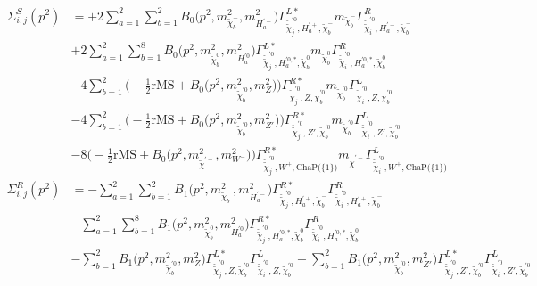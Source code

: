 \begin{itemize}
\begin{align} 
\Sigma^S_{i,j}(p^2) &= +2 \sum_{a=1}^{2}\sum_{b=1}^{2}{B_0\Big(p^{2},m^2_{\tilde{\chi}^-_{{b}}},m^2_{H^{'-}_{{a}}}\Big)} {\Gamma^{L*}_{\check{\tilde{\chi}}^{'0}_{{j}},H^{'+}_{{a}},\tilde{\chi}^-_{{b}}}} m_{\tilde{\chi}^-_{{b}}} {\Gamma^R_{\check{\tilde{\chi}}^{'0}_{{i}},H^{'+}_{{a}},\tilde{\chi}^-_{{b}}}}  \nonumber \\ 
 &+2 \sum_{a=1}^{2}\sum_{b=1}^{8}{B_0\Big(p^{2},m^2_{\tilde{\chi}^0_{{b}}},m^2_{H^{'0}_{{a}}}\Big)} {\Gamma^{L*}_{\check{\tilde{\chi}}^{'0}_{{j}},H^{{'0},*}_{{a}},\tilde{\chi}^0_{{b}}}} m_{\tilde{\chi}^0_{{b}}} {\Gamma^R_{\check{\tilde{\chi}}^{'0}_{{i}},H^{{'0},*}_{{a}},\tilde{\chi}^0_{{b}}}}  \nonumber \\ 
 &-4 \sum_{b=1}^{2}\Big(-\frac{1}{2} \text{rMS}  + {B_0\Big(p^{2},m^2_{\tilde{\chi}^{'0}_{{b}}},m^2_{Z}\Big)}\Big){\Gamma^{R*}_{\check{\tilde{\chi}}^{'0}_{{j}},Z,\tilde{\chi}^{'0}_{{b}}}} m_{\tilde{\chi}^{'0}_{{b}}} {\Gamma^L_{\check{\tilde{\chi}}^{'0}_{{i}},Z,\tilde{\chi}^{'0}_{{b}}}}  \nonumber \\ 
 &-4 \sum_{b=1}^{2}\Big(-\frac{1}{2} \text{rMS}  + {B_0\Big(p^{2},m^2_{\tilde{\chi}^{'0}_{{b}}},m^2_{{Z'}}\Big)}\Big){\Gamma^{R*}_{\check{\tilde{\chi}}^{'0}_{{j}},{Z'},\tilde{\chi}^{'0}_{{b}}}} m_{\tilde{\chi}^{'0}_{{b}}} {\Gamma^L_{\check{\tilde{\chi}}^{'0}_{{i}},{Z'},\tilde{\chi}^{'0}_{{b}}}}  \nonumber \\ 
 &-8 \Big(-\frac{1}{2} \text{rMS}  + {B_0\Big(p^{2},m^2_{\tilde{\chi}^{'-}},m^2_{W^-}\Big)}\Big){\Gamma^{R*}_{\check{\tilde{\chi}}^{'0}_{{j}},W^+,\text{ChaP}\Big(\{1\}\Big)}} m_{\tilde{\chi}^{'-}} {\Gamma^L_{\check{\tilde{\chi}}^{'0}_{{i}},W^+,\text{ChaP}\Big(\{1\}\Big)}} \\ 
\Sigma^R_{i,j}(p^2) &= - \sum_{a=1}^{2}\sum_{b=1}^{2}{B_1\Big(p^{2},m^2_{\tilde{\chi}^-_{{b}}},m^2_{H^{'-}_{{a}}}\Big)} {\Gamma^{R*}_{\check{\tilde{\chi}}^{'0}_{{j}},H^{'+}_{{a}},\tilde{\chi}^-_{{b}}}} {\Gamma^R_{\check{\tilde{\chi}}^{'0}_{{i}},H^{'+}_{{a}},\tilde{\chi}^-_{{b}}}}  \nonumber \\ 
 &- \sum_{a=1}^{2}\sum_{b=1}^{8}{B_1\Big(p^{2},m^2_{\tilde{\chi}^0_{{b}}},m^2_{H^{'0}_{{a}}}\Big)} {\Gamma^{R*}_{\check{\tilde{\chi}}^{'0}_{{j}},H^{{'0},*}_{{a}},\tilde{\chi}^0_{{b}}}} {\Gamma^R_{\check{\tilde{\chi}}^{'0}_{{i}},H^{{'0},*}_{{a}},\tilde{\chi}^0_{{b}}}}  \nonumber \\ 
 &- \sum_{b=1}^{2}{B_1\Big(p^{2},m^2_{\tilde{\chi}^{'0}_{{b}}},m^2_{Z}\Big)} {\Gamma^{L*}_{\check{\tilde{\chi}}^{'0}_{{j}},Z,\tilde{\chi}^{'0}_{{b}}}} {\Gamma^L_{\check{\tilde{\chi}}^{'0}_{{i}},Z,\tilde{\chi}^{'0}_{{b}}}}  - \sum_{b=1}^{2}{B_1\Big(p^{2},m^2_{\tilde{\chi}^{'0}_{{b}}},m^2_{{Z'}}\Big)} {\Gamma^{L*}_{\check{\tilde{\chi}}^{'0}_{{j}},{Z'},\tilde{\chi}^{'0}_{{b}}}} {\Gamma^L_{\check{\tilde{\chi}}^{'0}_{{i}},{Z'},\tilde{\chi}^{'0}_{{b}}}}  \nonumber \\ 

\end{align}
\end{itemize}
